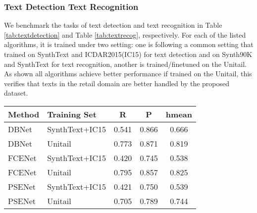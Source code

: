 \documentclass[runningheads]{llncs}
\begin{document}
\subsubsection{Text Detection  Text Recognition} We benchmark the tasks of text detection and text recognition in Table \ref{tab:textdetection} and Table \ref{tab:textrecog}, respectively. For each of the listed algorithms, it is trained under two setting: one is following a common setting that trained on SynthText\cite{SynthText} and ICDAR2015(IC15)\cite{ICDAR15} for text detection and on Synth90K\cite{Synth90k} and SynthText for text recognition, another is trained/finetuned on the Unitail. As shown all algorithms achieve better performance if trained on the Unitail, this verifies that texts in the retail domain are better handled by the proposed dataset. 

\begin{SCtable}[]
\centering
\setlength\tabcolsep{3pt}
\caption{Benchmarking text detection on Unitail. P and R stand for Precision and Recall, respectively. hmean is the harmonic mean of precision and recall. }
\begin{tabular}{l|l|ccc}
\hline \hline
Method         & Training Set        & R       & P       & hmean    \\ \hline
DBNet\cite{DBNet2020}          & SynthText+IC15      & 0.541   & 0.866   & 0.666    \\
DBNet          & Unitail             & 0.773   & 0.871   & 0.819    \\
FCENet\cite{FCENet2021}         & SynthText+IC15      & 0.420   & 0.745   & 0.538    \\
FCENet         & Unitail             & 0.795   & 0.857   & 0.825    \\
PSENet\cite{PSENet2019}         & SynthText+IC15      & 0.421   & 0.750   & 0.539    \\
PSENet         & Unitail             & 0.705   & 0.789   & 0.744    \\
\hline
\end{tabular}
\label{tab:textdetection}
\end{SCtable}
\end{document}
